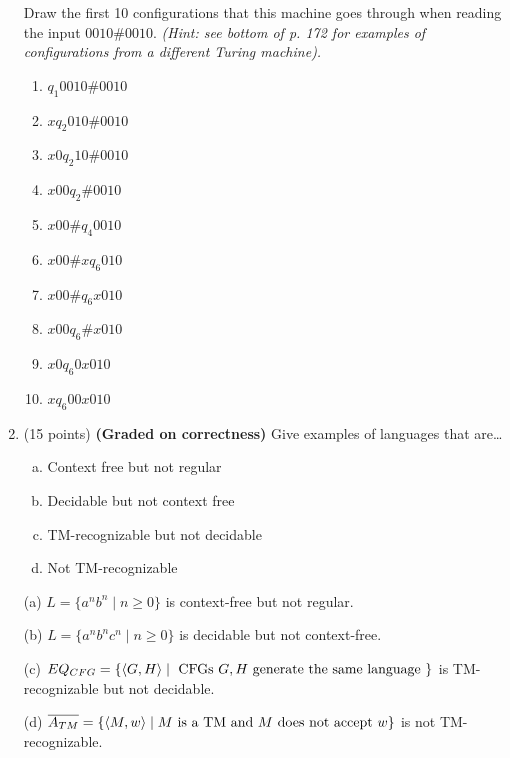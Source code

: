 \documentclass{article}
\theoremstyle{definition}
\newenvironment {solution}
{
\begin{tcolorbox}
}
{
\end{tcolorbox}
}
\begin{document}
\begin{enumerate}
    Draw the first 10 configurations that this machine goes through when reading the input $0010\#0010$. \textit{(Hint: see bottom of p. 172 for examples of configurations from a different Turing machine).}

        \begin{solution}
            \begin{enumerate}
                \item $q_1 0010\#0010$
                \item $xq_2 010\#0010$
                \item $x0q_2 10\#0010$
                \item $x00q_2 \#0010$
                \item $x00\#q_4 0010$
                \item $x00\#xq_6 010$
                \item $x00\#q_6 x010$
                \item $x00q_6 \#x010$
                \item $x0q_6 0x010$
                \item $xq_6 00x010$
            \end{enumerate}
        \end{solution}

    \item (15 points) \textbf{(Graded on correctness)} Give examples of languages that are\dots 
    \begin{enumerate}[(a)]
        \item Context free but not regular
        \item Decidable but not context free
        \item TM-recognizable but not decidable
        \item Not TM-recognizable
    \end{enumerate}

        \begin{solution}
            (a) $L = \{a^nb^n \mid n \geq 0\}$ is context-free but not regular.

            (b) $L = \{a^nb^nc^n \mid n \geq 0\}$ is decidable but not context-free.

            (c) $EQ_{CFG} = \{\langle G, H\rangle \mid \textnormal{ CFGs } G,H \textnormal{ generate the same language }\}$ is TM-recognizable but not decidable.

            (d) $\overline{A_{TM}} = \{\langle M, w\rangle \mid M \textnormal{ is a TM and } M \textnormal{ does not accept } w\}$ is not TM-recognizable.
        \end{solution}



\end{enumerate}
\end{document}

